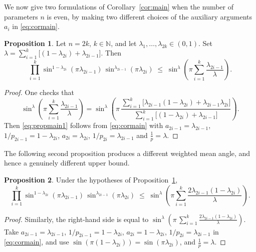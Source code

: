 \documentclass[12pt]{amsart}
\theoremstyle{definition}
\newtheorem{proposition}{Proposition}[section]
\begin{document}
We now give two formulations of Corollary~\ref{cor:main} when the number of parameters $n$ is even, by making two different choices of the auxiliary arguments $a_i$ in \eqref{eq:cormain}.

\begin{proposition}\label{prop:main1}
Let $n=2k$, $k\in\mathbb{N}$, and let
$\lambda_1,\ldots,\lambda_{2k}\in(0,1)$.
Set $\lambda=\displaystyle\sum_{i=1}^k
\bigl[(1-\lambda_{2i})+\lambda_{2i-1}\bigr]$.  Then
\begin{equation}\label{eq:propmain1}
  \prod_{i=1}^{k}\sin^{1-\lambda_{2i}}(\pi\lambda_{2i-1})\,
  \sin^{\lambda_{2i-1}}(\pi\lambda_{2i})
  \;\leq\;
  \sin^{\lambda}\!\left(\pi\sum_{i=1}^k
  \frac{\lambda_{2i-1}}{\lambda}\right).
\end{equation}
\end{proposition}

\begin{proof}
One checks that
\[
  \sin^\lambda\!\left(\pi\sum_{i=1}^k\frac{\lambda_{2i-1}}{\lambda}\right)
  = \sin^\lambda\!\left(\pi\,
  \frac{\sum_{i=1}^k
    \bigl[\lambda_{2i-1}(1-\lambda_{2i})+\lambda_{2i-1}\lambda_{2i}\bigr]}
  {\sum_{i=1}^k\bigl[(1-\lambda_{2i})+\lambda_{2i-1}\bigr]}\right).
\]
Then \eqref{eq:propmain1} follows from \eqref{eq:cormain} with
$a_{2i-1}=\lambda_{2i-1}$, $1/p_{2i-1}=1-\lambda_{2i}$,
$a_{2i}=\lambda_{2i}$, $1/p_{2i}=\lambda_{2i-1}$ and $\frac{1}{p}=\lambda$.
\end{proof}

The following second proposition produces a different weighted
mean angle, and hence a genuinely different upper bound.

\begin{proposition}\label{prop:main2}
Under the hypotheses of Proposition~\ref{prop:main1},
\begin{equation}\label{eq:propmain2}
  \prod_{i=1}^{k}\sin^{1-\lambda_{2i}}(\pi\lambda_{2i-1})\,
  \sin^{\lambda_{2i-1}}(\pi\lambda_{2i})
  \;\leq\;
  \sin^{\lambda}\!\left(\pi\sum_{i=1}^k
  \frac{2\lambda_{2i-1}(1-\lambda_{2i})}{\lambda}\right).
\end{equation}
\end{proposition}

\begin{proof}
Similarly, the right-hand side is
equal to $\sin^\lambda\!\left(\pi\,
\displaystyle\sum_{i=1}^k \frac{2\lambda_{2i-1}(1-\lambda_{2i})}{\lambda}\right)$.
Take $a_{2i-1}=\lambda_{2i-1}$, $1/p_{2i-1}=1-\lambda_{2i}$,
$a_{2i}=1-\lambda_{2i}$, $1/p_{2i}=\lambda_{2i-1}$
in \eqref{eq:cormain}, and use
$\sin(\pi(1-\lambda_{2i}))=\sin(\pi\lambda_{2i})$, and $\frac{1}{p}=\lambda$.
\end{proof}
\end{document}
